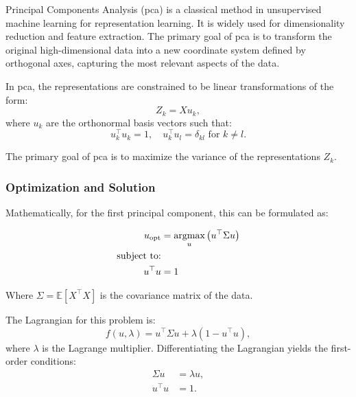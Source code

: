 Principal Components Analysis \citep{hotelling1933analysis} (\acrshort{pca}) is a classical method in unsupervised machine learning for representation learning.
It is widely used for dimensionality reduction and feature extraction.
The primary goal of \acrshort{pca} is to transform the original high-dimensional data into a new coordinate system defined by orthogonal axes, capturing the most relevant aspects of the data.

In \acrshort{pca}, the representations are constrained to be linear transformations of the form:
\begin{equation}
    \label{eq:pca-linear-function-def}
    Z_k = X u_k,
\end{equation}
where $u_k$ are the orthonormal basis vectors such that:
\begin{equation}
    \label{eq:pca-orthonormality-constraint}
    u_k^\top u_k = 1, \quad
    u_k^\top u_l = \delta_{kl} \text{ for } k \neq l.
\end{equation}

The primary goal of \acrshort{pca} is to maximize the variance of the representations \(Z_k\).

\subsubsection{Optimization and Solution}
Mathematically, for the first principal component, this can be formulated as:

\begin{align}
    u_{\text{opt}} & = \underset{u}{\text{argmax}} \left( u^\top \Sigma u \right) \\
    \text{subject to:} \notag                                                     \\
    u^\top u       & = 1 \notag
\end{align}

Where \(\Sigma = \mathbb{E}[X^\top X]\) is the covariance matrix of the data.

The Lagrangian for this problem is:
\begin{equation}
    f(u,\lambda) = u^\top \Sigma u + \lambda(1 - u^\top u),
\end{equation}
where \(\lambda\) is the Lagrange multiplier. Differentiating the Lagrangian yields the first-order conditions:
\begin{align}
    \Sigma u & = \lambda u, \\
    u^\top u & = 1.
\end{align}

